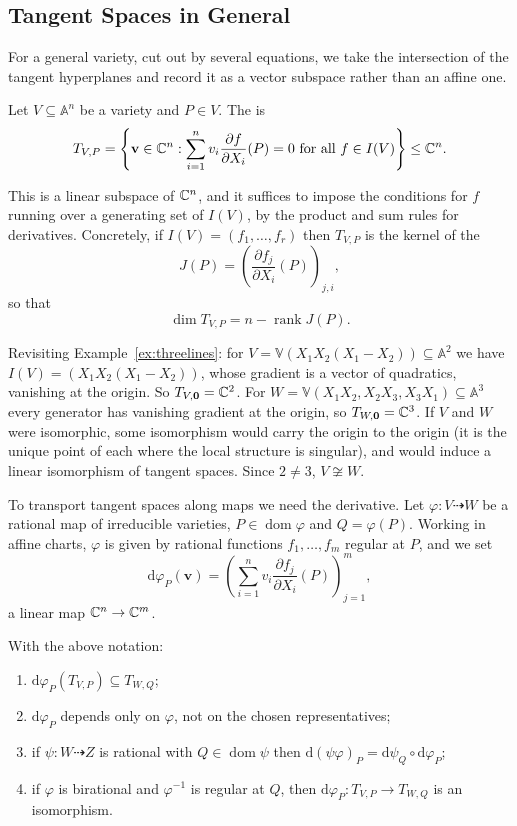\documentclass[a4paper]{scrartcl}
\newcommand{\A}{\mathbb{A}}
\newcommand{\V}{\mathbb{V}}
\newcommand{\dee}{\mathrm{d}}
\newcommand{\dto}{\dashrightarrow}
\DeclareMathOperator{\rk}{rank}
\DeclareMathOperator{\dom}{dom}
\begin{document}
\subsection{Tangent Spaces in General}

For a general variety, cut out by several equations, we take the intersection of the tangent hyperplanes and record it as a vector subspace rather than an affine one.

\begin{definition}
	Let $V \subseteq \A^n$ be a variety and $P \in V$. The  is
	$$T_{V,P} = \left\{\mathbf v \in \mathbb{C}^n : \sum_{i=1}^n v_i \frac{\partial f}{\partial X_i}(P) = 0 \text{ for all } f \in I(V)\right\} \leq \mathbb{C}^n.$$
\end{definition}

This is a linear subspace of $\mathbb{C}^n$, and it suffices to impose the conditions for $f$ running over a generating set of $I(V)$, by the product and sum rules for derivatives. Concretely, if $I(V) = (f_1,\dots,f_r)$ then $T_{V,P}$ is the kernel of the 
$$J(P) = \left(\frac{\partial f_j}{\partial X_i}(P)\right)_{j,i},$$
so that
$$\dim T_{V,P} = n - \rk J(P).$$

\begin{example}
	Revisiting Example~\ref{ex:threelines}: for $V = \V(X_1X_2(X_1-X_2)) \subseteq \A^2$ we have $I(V) = (X_1X_2(X_1-X_2))$, whose gradient is a vector of quadratics, vanishing at the origin. So $T_{V,\mathbf 0} = \mathbb{C}^2$. For $W = \V(X_1X_2,X_2X_3,X_3X_1) \subseteq \A^3$ every generator has vanishing gradient at the origin, so $T_{W,\mathbf 0} = \mathbb{C}^3$. If $V$ and $W$ were isomorphic, some isomorphism would carry the origin to the origin (it is the unique point of each where the local structure is singular), and would induce a linear isomorphism of tangent spaces. Since $2 \neq 3$, $V \not\cong W$.
\end{example}

To transport tangent spaces along maps we need the derivative. Let $\varphi \colon V \dto W$ be a rational map of irreducible varieties, $P \in \dom\varphi$ and $Q = \varphi(P)$. Working in affine charts, $\varphi$ is given by rational functions $f_1,\dots,f_m$ regular at $P$, and we set
$$\dee\varphi_P(\mathbf v) = \left(\sum_{i=1}^n v_i \frac{\partial f_j}{\partial X_i}(P)\right)_{j=1}^m,$$
a linear map $\mathbb{C}^n \to \mathbb{C}^m$.

\begin{proposition}\label{prop:dvarphi}
	With the above notation:
	\begin{enumerate}[label=(\roman*)]
		\item $\dee\varphi_P(T_{V,P}) \subseteq T_{W,Q}$;
		\item $\dee\varphi_P$ depends only on $\varphi$, not on the chosen representatives;
		\item if $\psi \colon W \dto Z$ is rational with $Q \in \dom\psi$ then $\dee(\psi\varphi)_P = \dee\psi_Q \circ \dee\varphi_P$;
		\item if $\varphi$ is birational and $\varphi^{-1}$ is regular at $Q$, then $\dee\varphi_P \colon T_{V,P} \to T_{W,Q}$ is an isomorphism.
	\end{enumerate}
\end{proposition}
\end{document}
